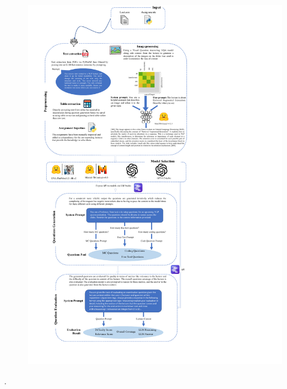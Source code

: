 


{
	\begin{figure}
		\begin{tikzfigure}
			\vspace*{1cm}
			\includegraphics[height=\textheight - 30cm, width=\columnwidth-10cm]{figures/chart.pdf}
		\end{tikzfigure}
	\end{figure}
	.
}


